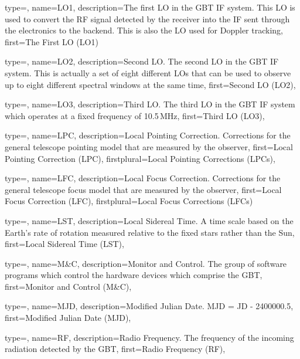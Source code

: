 {
  type=\acronymtype,
  name={LO1},
  description={The first LO in the GBT IF system.  This LO is used to convert
  the RF signal detected by the receiver into the IF sent through the 
  electronics to the backend.  This is also the LO used for Doppler tracking},
  first={The First LO (LO1)}
} 

{
  type=\acronymtype,
  name={LO2},
  description={Second LO.
The second LO in the GBT IF system.  This is actually a set of
eight different LOs that can be used to observe up to eight different spectral
windows at the same time},
  first={Second LO (LO2)},
}

{
  type=\acronymtype,
  name={LO3},
  description={Third LO.
The third LO in the GBT IF system which operates at a fixed 
frequency of 10.5\,MHz},
  first={Third LO (LO3)},
}

{
  type=\acronymtype,
  name={LPC},
  description={Local Pointing Correction.
Corrections for the general telescope pointing model that are 
measured by the observer},
  first={Local Pointing Correction (LPC)},
  firstplural={Local Pointing Corrections (LPCs)},
}

{
  type=\acronymtype,
  name={LFC},
  description={Local Focus Correction.
Corrections for the general telescope focus model that are 
               measured by the observer},
  first={Local Focus Correction (LFC)},
  firstplural={Local Focus Corrections (LFCs)}
} 

{
  type=\acronymtype,
  name={LST},
  description={Local Sidereal Time.  A time scale based on the Earth's rate
of rotation measured relative to the fixed stars rather than the Sun},
  first={Local Sidereal Time (LST)},
} 

{
  type=\acronymtype,
  name={M\&C},
  description={Monitor and Control.
The group of software programs which control the hardware 
               devices which comprise the GBT},
  first={Monitor and Control (M\&C)},
} 

{
  type=\acronymtype,
  name={MJD},
  description={Modified Julian Date.  MJD = \gls{JD} - 2400000.5},
  first={Modified Julian Date (MJD)},
} 

{
  type=\acronymtype,
  name={RF},
  description={Radio Frequency.
The frequency of the incoming radiation detected by the GBT},
  first={Radio Frequency (RF)},
}

